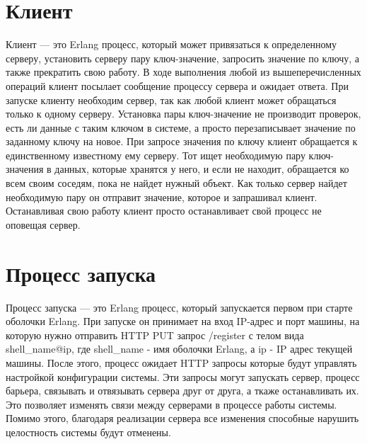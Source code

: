 	\section{Клиент}
		Клиент --- это Erlang процесс, который может привязаться к определенному серверу, установить серверу пару ключ-значение,
		запросить значение по ключу, а также прекратить свою работу. В ходе выполнения любой из вышеперечисленных операций клиент посылает сообщение
		процессу сервера и ожидает ответа. При запуске клиенту необходим сервер, так как любой клиент может обращаться только к одному серверу.
		Установка пары ключ-значение не производит проверок, есть ли данные с таким ключом в системе, а просто перезаписывает значение по заданному 
		ключу на новое. При запросе значения по ключу клиент обращается к единственному известному ему серверу. Тот ищет необходимую пару ключ-значения 
		в данных, которые хранятся у него, и если не находит, обращается ко всем своим соседям, пока не найдет нужный объект. Как только сервер найдет
		необходимую пару он отправит значение, которое и запрашивал клиент. Останавливая свою работу клиент просто останавливает свой процесс не оповещая
		сервер.


	\section{Процесс запуска}
		Процесс запуска --- это Erlang процесс, который запускается первом при старте оболочки Erlang. При запуске он принимает на вход IP-адрес и порт 
		машины, на которую нужно отправить HTTP PUT запрос /register с телом вида shell\_name@ip, где shell\_name - имя оболочки Erlang, а ip - IP адрес
		текущей машины. После этого, процесс ожидает HTTP запросы которые будут управлять настройкой конфигурации системы. Эти запросы могут запускать
		сервер, процесс барьера, связывать и отвязывать сервера друг от друга, а ткаже останавливать их. Это позволяет изменять связи между серверами 
		в процессе работы системы. Помимо этого, благодаря реализации сервера все изменения способные нарушить целостность системы будут отменены.
	

